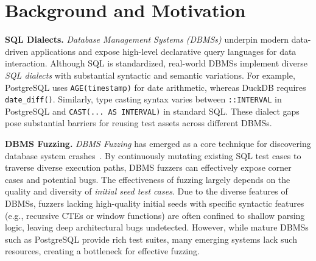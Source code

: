 \documentclass[conference]{IEEEtran}
\begin{document}

\section{Background and Motivation}
\label{sec:background}
\textbf{SQL Dialects.} 
\textit{Database Management Systems (DBMSs)} underpin modern data-driven applications and expose high-level declarative query languages for data interaction. Although SQL is standardized, real-world DBMSs implement diverse \textit{SQL dialects} with substantial syntactic and semantic variations.
For example, PostgreSQL uses \texttt{AGE(timestamp)} for date arithmetic, whereas DuckDB requires \texttt{date\_diff()}. Similarly, type casting syntax varies between \texttt{::INTERVAL} in PostgreSQL and \texttt{CAST(... AS INTERVAL)} in standard SQL. 
These dialect gaps pose substantial barriers for reusing test assets across different DBMSs.



\textbf{DBMS Fuzzing.} 
\textit{DBMS Fuzzing} has emerged as a core technique for discovering database system crashes~\cite{sqlsmith, zhong2020squirrel, wang2021industry}. By continuously mutating existing SQL test cases to traverse diverse execution paths, DBMS fuzzers can effectively expose corner cases and potential bugs.
The effectiveness of fuzzing largely depends on the quality and diversity of \textit{initial seed test cases}.
Due to the diverse features of DBMSs, fuzzers lacking high-quality initial seeds with specific syntactic features (e.g., recursive CTEs or window functions) are often confined to shallow parsing logic, leaving deep architectural bugs undetected.
However, while mature DBMSs such as PostgreSQL provide rich test suites, many emerging systems lack such resources, creating a bottleneck for effective fuzzing.
\end{document}
